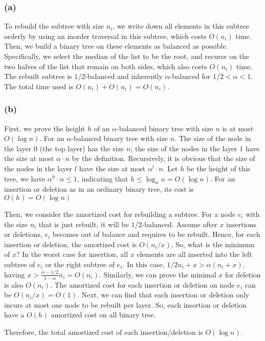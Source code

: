 \documentclass[12pt,onecolumn,a4paper]{article}
\begin{document}
\subsubsection*{(a)} 
To rebuild the subtree with size $n_i$, we write down all elements in this subtree orderly by using an inorder traversal in this subtree, which costs $O(n_i)$ time. Then, we build a binary tree on these elements as balanced as possible. Specifically, we select the median of the list to be the root, and recurse on the two halves of the list that remain on both sides, which also costs $O(n_i)$ time. The rebuilt subtree is $1/2$-balanced and inherently $\alpha$-balanced for $1/2<\alpha<1$. The total time used is $O(n_i)+O(n_i)=O(n_i)$.
\subsubsection*{(b)}
First, we prove the height $h$ of an $\alpha$-balanced binary tree with size $n$ is at most $O(\log n)$.
For an $\alpha$-balanced binary tree with size $n$. The size of the node in the layer $0$ (the top layer) has the size $n$; the size of the nodes in the layer $1$ have the size at most $\alpha\cdot n$ by the definition. Recursively, it is obvious that the size of the nodes in the layer $l$ have the size at most $\alpha^l\cdot n$. Let $h$ be the height of this tree, we have $\alpha^h\cdot n\le 1$, indicating that $h\le \log_\alpha n=O(\log n).$ For an insertion or deletion as in an ordinary binary tree, its cost is $O(h)=O(\log n)$

Then, we consider the amortized cost for rebuilding a subtree. For a node $e_i$ with the size $n_i$ that is just rebuilt, it will be $1/2$-balanced. 
Assume after $x$ insertions or deletions, $e_i$ becomes out of balance and requires to be rebuilt. Hence, for each insertion or deletion, the amortized cost is $O(n_i/x)$. So, what is the minimum of $x$? In the worst case for insertion, all $x$ elements are all inserted into the left subtree of $e_i$ or the right subtree of $e_i$. In this case, $1/2 n_i+x>\alpha (n_i+x)$, having $x>\frac{\alpha-1/2}{1-\alpha} n_i=O(n_i)$. Similarly, we can prove the minimal $x$ for deletion is also $O(n_i)$. The amortized cost for each insertion or deletion on node $e_i$ can be $O(n_i/x)=O(1)$. Next, we can find that each insertion or deletion only incurs at most one node to be rebuilt per layer. So, each insertion or deletion have a $O(h)$ amortized cost on all binary tree.

Therefore, the total amortized cost of each insertion/deletion is $O(\log n)$.
\end{document}
